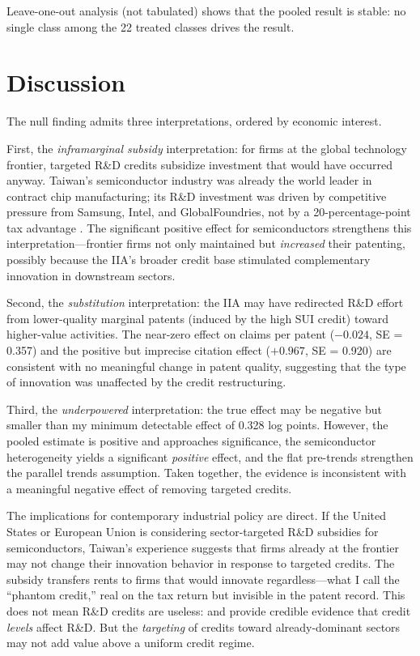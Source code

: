 \documentclass[12pt]{article}
\begin{document}
Leave-one-out analysis (not tabulated) shows that the pooled result is stable: no single class among the 22 treated classes drives the result.


\section{Discussion}

The null finding admits three interpretations, ordered by economic interest.

First, the \textit{inframarginal subsidy} interpretation: for firms at the global technology frontier, targeted R\&D credits subsidize investment that would have occurred anyway. Taiwan's semiconductor industry was already the world leader in contract chip manufacturing; its R\&D investment was driven by competitive pressure from Samsung, Intel, and GlobalFoundries, not by a 20-percentage-point tax advantage \citep{fuller2005creating}. The significant positive effect for semiconductors strengthens this interpretation---frontier firms not only maintained but \textit{increased} their patenting, possibly because the IIA's broader credit base stimulated complementary innovation in downstream sectors.

Second, the \textit{substitution} interpretation: the IIA may have redirected R\&D effort from lower-quality marginal patents (induced by the high SUI credit) toward higher-value activities. The near-zero effect on claims per patent ($-0.024$, SE = 0.357) and the positive but imprecise citation effect ($+0.967$, SE = 0.920) are consistent with no meaningful change in patent quality, suggesting that the type of innovation was unaffected by the credit restructuring.

Third, the \textit{underpowered} interpretation: the true effect may be negative but smaller than my minimum detectable effect of 0.328 log points. However, the pooled estimate is positive and approaches significance, the semiconductor heterogeneity yields a significant \textit{positive} effect, and the flat pre-trends strengthen the parallel trends assumption. Taken together, the evidence is inconsistent with a meaningful negative effect of removing targeted credits.

The implications for contemporary industrial policy are direct. If the United States or European Union is considering sector-targeted R\&D subsidies for semiconductors, Taiwan's experience suggests that firms already at the frontier may not change their innovation behavior in response to targeted credits. The subsidy transfers rents to firms that would innovate regardless---what I call the ``phantom credit,'' real on the tax return but invisible in the patent record. This does not mean R\&D credits are useless: \citet{bloom2002patents} and \citet{dechezlepretre2016tax} provide credible evidence that credit \textit{levels} affect R\&D. But the \textit{targeting} of credits toward already-dominant sectors may not add value above a uniform credit regime.
\end{document}
